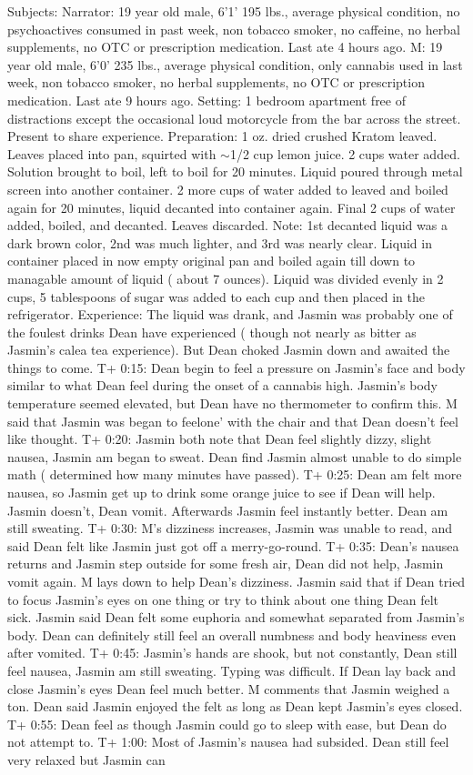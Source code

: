 \documentclass[12pt]{book}
\begin{document}
Subjects: Narrator: 19 year old male, 6'1' 195 lbs., average physical condition, no psychoactives consumed in past week, non tobacco smoker, no caffeine, no herbal supplements, no OTC or prescription medication. Last ate 4 hours ago. M: 19 year old male, 6'0' 235 lbs., average physical condition, only cannabis used in last week, non tobacco smoker, no herbal supplements, no OTC or prescription medication. Last ate 9 hours ago. Setting: 1 bedroom apartment free of distractions except the occasional loud motorcycle from the bar across the street. Present to share experience. Preparation: 1 oz. dried crushed Kratom leaved. Leaves placed into pan, squirted with $\sim$1/2 cup lemon juice. 2 cups water added. Solution brought to boil, left to boil for 20 minutes. Liquid poured through metal screen into another container. 2 more cups of water added to leaved and boiled again for 20 minutes, liquid decanted into container again. Final 2 cups of water added, boiled, and decanted. Leaves discarded. Note: 1st decanted liquid was a dark brown color, 2nd was much lighter, and 3rd was nearly clear. Liquid in container placed in now empty original pan and boiled again till down to managable amount of liquid ( about 7 ounces). Liquid was divided evenly in 2 cups, 5 tablespoons of sugar was added to each cup and then placed in the refrigerator. Experience: The liquid was drank, and Jasmin was probably one of the foulest drinks Dean have experienced ( though not nearly as bitter as Jasmin's calea tea experience). But Dean choked Jasmin down and awaited the things to come. T+ 0:15: Dean begin to feel a pressure on Jasmin's face and body similar to what Dean feel during the onset of a cannabis high. Jasmin's body temperature seemed elevated, but Dean have no thermometer to confirm this. M said that Jasmin was began to feelone' with the chair and that Dean doesn't feel like thought. T+ 0:20: Jasmin both note that Dean feel slightly dizzy, slight nausea, Jasmin am began to sweat. Dean find Jasmin almost unable to do simple math ( determined how many minutes have passed). T+ 0:25: Dean am felt more nausea, so Jasmin get up to drink some orange juice to see if Dean will help. Jasmin doesn't, Dean vomit. Afterwards Jasmin feel instantly better. Dean am still sweating. T+ 0:30: M's dizziness increases, Jasmin was unable to read, and said Dean felt like Jasmin just got off a merry-go-round. T+ 0:35: Dean's nausea returns and Jasmin step outside for some fresh air, Dean did not help, Jasmin vomit again. M lays down to help Dean's dizziness. Jasmin said that if Dean tried to focus Jasmin's eyes on one thing or try to think about one thing Dean felt sick. Jasmin said Dean felt some euphoria and somewhat separated from Jasmin's body. Dean can definitely still feel an overall numbness and body heaviness even after vomited. T+ 0:45: Jasmin's hands are shook, but not constantly, Dean still feel nausea, Jasmin am still sweating. Typing was difficult. If Dean lay back and close Jasmin's eyes Dean feel much better. M comments that Jasmin weighed a ton. Dean said Jasmin enjoyed the felt as long as Dean kept Jasmin's eyes closed. T+ 0:55: Dean feel as though Jasmin could go to sleep with ease, but Dean do not attempt to. T+ 1:00: Most of Jasmin's nausea had subsided. Dean still feel very relaxed but Jasmin can 
\end{document}
